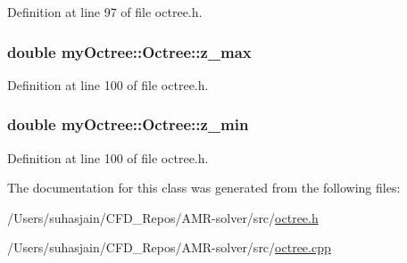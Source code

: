 Definition at line 97 of file octree.\+h.

\hypertarget{classmy_octree_1_1_octree_a1ec71e5c3e48edf04aa20639dd055e79}{}
\subsubsection[{z\+\_\+max}]{\setlength{\rightskip}{0pt plus 5cm}double my\+Octree\+::\+Octree\+::z\+\_\+max}\label{classmy_octree_1_1_octree_a1ec71e5c3e48edf04aa20639dd055e79}


Definition at line 100 of file octree.\+h.

\hypertarget{classmy_octree_1_1_octree_a8681e21690dc7dabb18c2b3541e20817}{}
\subsubsection[{z\+\_\+min}]{\setlength{\rightskip}{0pt plus 5cm}double my\+Octree\+::\+Octree\+::z\+\_\+min}\label{classmy_octree_1_1_octree_a8681e21690dc7dabb18c2b3541e20817}


Definition at line 100 of file octree.\+h.



The documentation for this class was generated from the following files\+:\begin{DoxyCompactItemize}
\item 
/\+Users/suhasjain/\+C\+F\+D\+\_\+\+Repos/\+A\+M\+R-\/solver/src/\hyperlink{octree_8h}{octree.\+h}\item 
/\+Users/suhasjain/\+C\+F\+D\+\_\+\+Repos/\+A\+M\+R-\/solver/src/\hyperlink{octree_8cpp}{octree.\+cpp}\end{DoxyCompactItemize}

